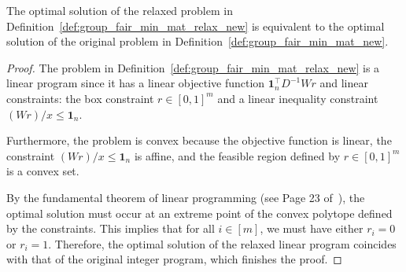 \begin{theorem}\label{thm:lp_equiv_append}
    The optimal solution of the relaxed problem in Definition~\ref{def:group_fair_min_mat_relax_new} is equivalent to the optimal solution of the original problem in Definition~\ref{def:group_fair_min_mat_new}.
\end{theorem}
\begin{proof} 
    The problem in Definition~\ref{def:group_fair_min_mat_relax_new} is a linear program since it has a linear objective function $\mathbf{1}^\top_nD^{-1}Wr$ and linear constraints: the box constraint $r\in[0,1]^m$ and a linear inequality constraint $(Wr)/x \leq \mathbf{1}_n$.

    Furthermore, the problem is convex because the objective function is linear, the constraint $(Wr)/x \leq \mathbf{1}_n$ is affine, and the feasible region defined by $r\in[0,1]^m$ is a convex set.

    By the fundamental theorem of linear programming (see Page 23 of~\cite{ly84}), the optimal solution must occur at an extreme point of the convex polytope defined by the constraints. This implies that for all $i \in [m]$, we must have either $r_i = 0$ or $r_i = 1$. Therefore, the optimal solution of the relaxed linear program coincides with that of the original integer program, which finishes the proof.
\end{proof}
